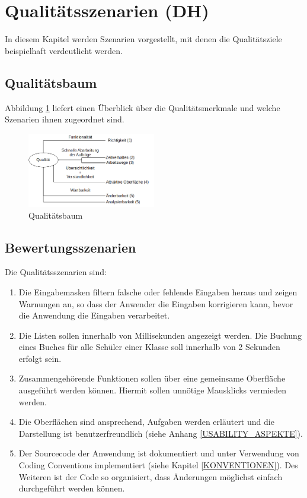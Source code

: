 \section{Qualitätsszenarien (DH)}
In diesem Kapitel werden Szenarien vorgestellt, mit denen die Qualitätsziele beispielhaft verdeutlicht werden. 

\subsection{Qualitätsbaum}
Abbildung \ref{fig:Qualitaetsbaum} liefert einen Überblick über die Qualitätsmerkmale und welche Szenarien ihnen zugeordnet sind.
\begin{figure}[htbp]
	\centering
		\includegraphics[width=0.50\textwidth]{figures/Qualitaetsbaum.PNG}
	\caption{Qualitätsbaum}
	\label{fig:Qualitaetsbaum}
\end{figure}

\subsection{Bewertungsszenarien}
Die Qualitätsszenarien sind:
\begin{enumerate}
	\item Die Eingabemasken filtern falsche oder fehlende Eingaben heraus und zeigen Warnungen an, so dass der Anwender die Eingaben korrigieren kann, bevor die Anwendung die Eingaben verarbeitet.
	\item Die Listen sollen innerhalb von Millisekunden angezeigt werden. Die Buchung eines Buches für alle Schüler einer Klasse soll innerhalb von 2 Sekunden erfolgt sein.
	\item Zusammengehörende Funktionen sollen über eine gemeinsame Oberfläche ausgeführt werden können. Hiermit sollen unnötige Mausklicks vermieden werden.
	\item Die Oberflächen sind ansprechend, Aufgaben werden erläutert und die Darstellung ist benutzerfreundlich (siehe Anhang \ref{USABILITY_ASPEKTE}).
	\item Der Sourcecode der Anwendung ist dokumentiert und unter Verwendung von Coding Conventions implementiert (siehe Kapitel \ref{KONVENTIONEN}). Des Weiteren ist der Code so organisiert, dass Änderungen möglichst einfach durchgeführt werden können.
\end{enumerate}